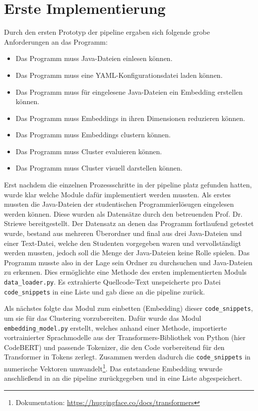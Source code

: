 \section{Erste Implementierung}
Durch den ersten Prototyp der pipeline ergaben sich folgende grobe Anforderungen an das Programm:
\begin{itemize}
    \item Das Programm muss Java-Dateien einlesen können.
    \item Das Programm muss eine YAML-Konfigurationsdatei laden können.
    \item Das Programm muss für eingelesene Java-Dateien ein Embedding erstellen können.
    \item Das Programm muss Embeddings in ihren Dimensionen reduzieren können.
    \item Das Programm muss Embeddings clustern können.
    \item Das Programm muss Cluster evaluieren können.
    \item Das Programm muss Cluster visuell darstellen können.
\end{itemize}
Erst nachdem die einzelnen Prozessschritte in der pipeline platz gefunden hatten, wurde klar welche Module dafür implementiert werden mussten. Als erstes mussten die Java-Dateien der studentischen Programmierlösugen eingelesen werden können. Diese wurden als Datensätze durch den betreuenden Prof. Dr. Striewe bereitgestellt. Der Datensatz an denen das Programm fortlaufend getestet wurde, bestand aus mehreren Überordner und final aus drei Java-Dateien und einer Text-Datei, welche den Studenten vorgegeben waren und vervollständigt werden mussten, jedoch soll die Menge der Java-Dateien keine Rolle spielen. Das Programm musste also in der Lage sein Ordner zu durchsuchen und Java-Dateien zu erkennen. Dies ermöglichte eine Methode des ersten implementierten Moduls \texttt{data\_loader.py}. Es extrahierte Quellcode-Text unspeicherte pro Datei \texttt{code\_snippets} in eine Liste und gab diese an die pipeline zurück.

Als nächstes folgte das Modul zum einbetten (Embedding) dieser \texttt{code\_snippets}, um sie für das Clustering vorzubereiten. Dafür wurde das Modul \texttt{embedding\_model.py} erstellt, welches anhand einer Methode, importierte vortrainierter Sprachmodelle aus der Transformers-Bibliothek von Python (hier CodeBERT) und passende Tokenizer, die den Code vorbereitend für den Transformer in Tokens zerlegt. Zusammen werden dadurch die \texttt{code\_snippets} in numerische Vektoren umwandelt\footnote{Dokumentation: \url{https://huggingface.co/docs/transformers}}. Das entstandene Embedding wwurde anschließend in an die pipeline zurückgegeben und in eine Liste abgespeichert.

